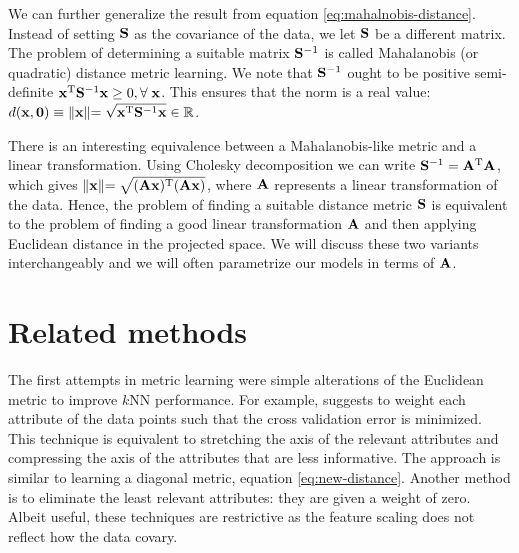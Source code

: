 We can further generalize the result from equation \ref{eq:mahalnobis-distance}.
Instead of setting $\mathbf{S}$ as the covariance of the data, we let $\mathbf{S}$ be a different matrix. The problem of determining a suitable matrix
$\mathbf{S}^{-1}$ is called Mahalanobis (or quadratic) distance metric learning. We note that $\mathbf{S}^{-1}$ ought to be positive semi-definite $\mathbf{x}^\textrm{T}\mathbf{S}^{-1}\mathbf{x} \geq 0, \forall\;\mathbf{x}$. This ensures that the norm is a real value: $d(\mathbf{x},\mathbf{0})\equiv\lVert \mathbf{x}\lVert = \sqrt{\mathbf{x}^\textrm{T}\mathbf{S}^{-1}\mathbf{x}}\in\mathbb{R}$.



There is an interesting equivalence between a Mahalanobis-like metric and a linear transformation. Using Cholesky decomposition we can write $\mathbf{S}^{-1}=\mathbf{A}^\textrm{T}\mathbf{A}$, which gives $\lVert \mathbf{x} \lVert = \sqrt{(\mathbf{A}\mathbf{x})^\textrm{T}(\mathbf{A}\mathbf{x})}$, where $\mathbf{A}$ represents a linear transformation of the data. Hence, the problem of finding a suitable distance metric $\mathbf{S}$ is equivalent to the problem of finding a good linear transformation $\mathbf{A}$ and then applying Euclidean distance in the projected space. We will discuss these two variants interchangeably and we will often parametrize our models in terms of $\mathbf{A}$.

\section{Related methods}
\label{sec:related-methods}

The first attempts in metric learning were simple alterations of the Euclidean metric to improve $k$NN performance. For example, \citet{mitchell1997} suggests to weight each attribute of the data points such that the cross validation error is minimized. This technique is equivalent to stretching the axis of the relevant attributes and compressing the axis of the attributes that are less informative. The approach is similar to learning a diagonal metric, equation \ref{eq:new-distance}. Another method \citep{moore1994} is to eliminate the least relevant attributes: they are given a weight of zero. Albeit useful, these techniques are restrictive as the feature scaling does not reflect how the data covary.

